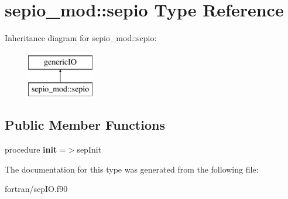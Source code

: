 \hypertarget{structsepio__mod_1_1sepio}{}\section{sepio\+\_\+mod\+:\+:sepio Type Reference}
\label{structsepio__mod_1_1sepio}
Inheritance diagram for sepio\+\_\+mod\+:\+:sepio\+:\begin{figure}[H]
\begin{center}
\leavevmode
\includegraphics[height=2.000000cm]{structsepio__mod_1_1sepio}
\end{center}
\end{figure}
\subsection*{Public Member Functions}
\begin{DoxyCompactItemize}
\item 
\mbox{\label{structsepio__mod_1_1sepio_a9d864c7711f61d39299131a8b6cefbb4}} 
procedure {\bfseries init} =$>$sep\+Init
\end{DoxyCompactItemize}


The documentation for this type was generated from the following file\+:\begin{DoxyCompactItemize}
\item 
fortran/sep\+I\+O.\+f90\end{DoxyCompactItemize}
